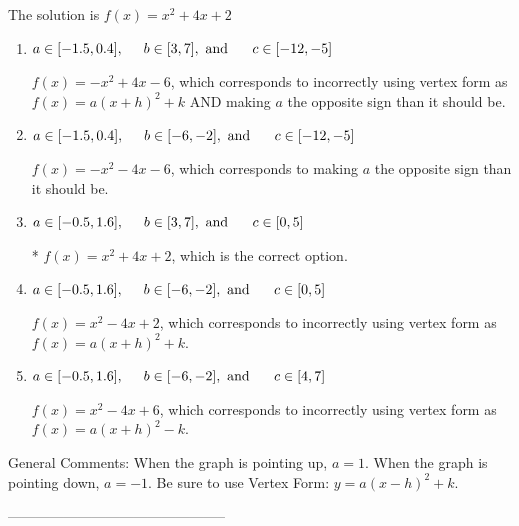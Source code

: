 \documentclass{article}[14pt]
\begin{document}
The solution is $ f(x) = x^{2} +4 x + 2 $ 

\begin{enumerate}[label=\Alph*.] 
\item $ a \in [-1.5, 0.4], \hspace*{5mm} b \in [3, 7], \text{ and } \hspace*{5mm} c \in [-12, -5] $ 

 $f(x)=-x^{2} +4 x -6$, which corresponds to incorrectly using vertex form as $f(x) = a(x+h)^2+k$ AND making $a$ the opposite sign than it should be. 
\item $ a \in [-1.5, 0.4], \hspace*{5mm} b \in [-6, -2], \text{ and } \hspace*{5mm} c \in [-12, -5] $ 

 $f(x)=-x^{2} -4 x -6$, which corresponds to making $a$ the opposite sign than it should be. 
\item $ a \in [-0.5, 1.6], \hspace*{5mm} b \in [3, 7], \text{ and } \hspace*{5mm} c \in [0, 5] $ 

 * $f(x)=x^{2} +4 x + 2$, which is the correct option. 
\item $ a \in [-0.5, 1.6], \hspace*{5mm} b \in [-6, -2], \text{ and } \hspace*{5mm} c \in [0, 5] $ 

 $f(x)=x^{2} -4 x + 2$, which corresponds to incorrectly using vertex form as $f(x) = a(x+h)^2+k$. 
\item $ a \in [-0.5, 1.6], \hspace*{5mm} b \in [-6, -2], \text{ and } \hspace*{5mm} c \in [4, 7] $ 

 $f(x)=x^{2} -4 x + 6$, which corresponds to incorrectly using vertex form as $f(x) = a(x+h)^2 - k$. 
\end{enumerate} 
 
General Comments: When the graph is pointing up, $a=1$. When the graph is pointing down, $a=-1$. Be sure to use Vertex Form: $y = a(x-h)^2+k$.

-----------------------------------------------
\end{document}
